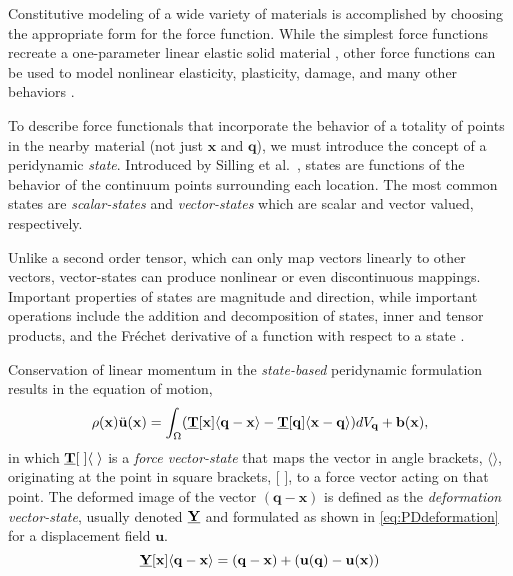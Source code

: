 \documentclass[preprint,review,12pt]{elsarticle}
\newcommand\vstate[3]{%
	\mathbf{\underline{#1}}%
	\ifstrempty{#2}{}{[#2]}%
	\ifstrempty{#3}{}{\langle #3 \rangle}}
\begin{document}
Constitutive modeling of a wide variety of materials is accomplished by choosing the appropriate form for the force function.  While the simplest force functions recreate a one-parameter linear elastic solid material \cite{silling2000reformulation}, other force functions can be used to model nonlinear elasticity, plasticity, damage, and many other behaviors \cite{silling2005peridynamic, dayal2006kinetics, gerstle2007peridynamic, silling2007peridynamic, warren2009non, foster2010viscoplasticity,foster2011energy,taylor2013two,ogrady2014beams}.

To describe force functionals that incorporate the behavior of a totality of points in the nearby material (not just $\mathbf{x}$ and $\mathbf{q}$), we must introduce the concept of a peridynamic \emph{state}.
Introduced by Silling et al.\ \cite{silling2007peridynamic}, states are functions of the behavior of the continuum points surrounding each location.  The most common states are \emph{scalar-states} and \emph{vector-states} which are scalar and vector valued, respectively.

Unlike a second order tensor, which can only map vectors linearly to other vectors, vector-states can produce nonlinear or even discontinuous mappings.  Important properties of states are magnitude and direction, while important operations include the addition and decomposition of states, inner and tensor products, and the Fr\'{e}chet derivative of a function with respect to a state \cite{silling2007peridynamic}.

Conservation of linear momentum in the \textit{state-based} peridynamic formulation results in the equation of motion,
%
\begin{equation}
    \label{eq:PDstateEoM}
    \rho(\mathbf{x})\ddot{\mathbf{u}}(\mathbf{x}) = \int_\Omega (\vstate{T}{\mathbf{x}}{\mathbf{q}-\mathbf{x}}-\vstate{T}{\mathbf{q}}{\mathbf{x}-\mathbf{q}}) dV_\mathbf{q}  + \mathbf{b}(\mathbf{x}),
\end{equation}
%
in which $\vstate{T}{\;}{\;}$ is a \textit{force vector-state} that maps the vector in angle brackets, $\langle \rangle$, originating at the point in square brackets, [ ], to a force vector acting on that point.
The deformed image of the vector $(\mathbf{q-x})$ is defined as the \textit{deformation vector-state}, usually denoted $\vstate{Y}{}{}$ and formulated as shown in \cref{eq:PDdeformation} for a displacement field \(\mathbf{u}\). 
%
\begin{equation}
    \label{eq:PDdeformation}
    \vstate{Y}{\mathbf{x}}{\mathbf{q}-\mathbf{x}} = (\mathbf{q}-\mathbf{x}) + (\mathbf{u}(\mathbf{q})-\mathbf{u}(\mathbf{x}))
\end{equation}
%
\end{document}
